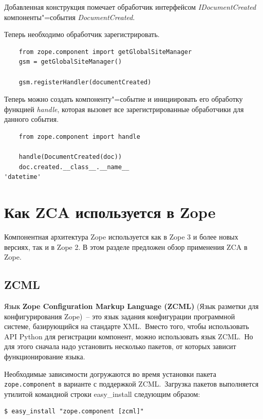 \documentclass[a4paper,openany,twoside,final]{book}
\providecommand*{\DUroletitlereference}[1]{\textsl{#1}}
\begin{document}
Добавленная конструкция помечает обработчик интерфейсом \DUroletitlereference{IDocumentCreated} компоненты"=события \DUroletitlereference{DocumentCreated}.

Теперь необходимо обработчик зарегистрировать.

\begin{verbatim}
    from zope.component import getGlobalSiteManager
    gsm = getGlobalSiteManager()

    gsm.registerHandler(documentCreated)
\end{verbatim}

Теперь можно создать компоненту"=событие и инициировать его обработку функцией \DUroletitlereference{handle}, которая вызовет все зарегистрированные обработчики для данного события.

\begin{verbatim}
    from zope.component import handle

    handle(DocumentCreated(doc))
    doc.created.__class__.__name__
'datetime'
\end{verbatim}


\chapter{Как ZCA используется в Zope%
  \label{zca-zope}%
}

Компонентная архитектура Zope используется как в Zope 3 и более новых версиях, так и в Zope 2.  В этом разделе предложен обзор применения ZCA в Zope.


\section{ZCML%
  \label{zcml}%
}

Язык \textbf{Zope Configuration Markup Language (ZCML)} (Язык разметки для конфигурирования Zope)~-- это язык задания конфигурации программной системе, базирующийся на стандарте XML.~Вместо того, чтобы использовать API Python для регистрации компонент, можно использовать язык ZCML.~Но для этого сначала надо установить несколько пакетов, от которых зависит функционирование языка.

Необходимые зависимости догружаются во время установки пакета \texttt{zope.component} в варианте с поддержкой ZCML.~Загрузка пакетов выполняется утилитой командной строки easy\_install следующим образом:

\begin{verbatim}
$ easy_install "zope.component [zcml]"
\end{verbatim}%
\end{document}
